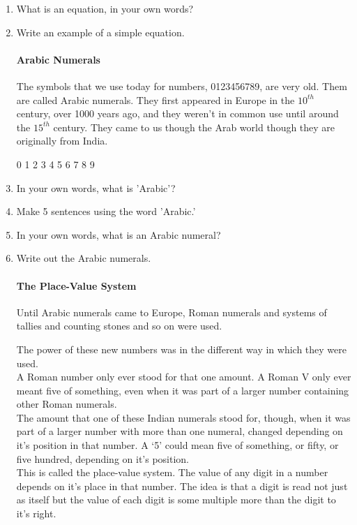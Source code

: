 \documentclass[12pt]{article}
\begin{document}
\begin{enumerate}
\item What is an equation, in your own words?
\item Write an example of a simple equation.

\paragraph{Arabic Numerals}
The symbols that we use today for numbers, 0123456789, are very old. Them are called Arabic numerals. They first appeared in Europe in the $10^{th}$ century, over 1000 years ago, and they weren't in common use until around the $15^{th}$ century. They came to us though the Arab world though they are originally from India.\\
\begin{center}
{\Huge 0 1 2 3 4 5 6 7 8 9}
\end{center}

\item In your own words, what is 'Arabic'?
\item Make 5 sentences using the word 'Arabic.'
\item In your own words, what is an Arabic numeral?
\item Write out the Arabic numerals.

\paragraph{The Place-Value System}
Until Arabic numerals came to Europe, Roman numerals and systems of tallies and counting stones and so on were used.

The power of these new numbers was in the different way in which they were used.\\

A Roman number only ever stood for that one amount. A Roman V only ever meant five of something, even when it was part of a larger number containing other Roman numerals.\\

The amount that one of these Indian numerals stood for, though, when it was part of a larger number with more than one numeral, changed depending on it’s position in that number. A ‘5’ could mean five of something, or fifty, or five hundred, depending on it’s position.\\

This is called the place-value system. The value of any digit in a number depends on it’s place in that number. The idea is that a digit is read not just as itself but the value of each digit is some multiple more than the digit to it’s right.\\


\end{enumerate}
\end{document}
